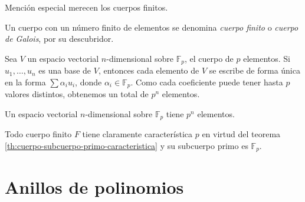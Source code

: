 
Mención especial merecen los cuerpos finitos.

Un cuerpo con un número finito de elementos se denomina \textit{cuerpo finito} o \textit{cuerpo de Galois}, por su descubridor.

Sea \(V\) un espacio vectorial \(n\)-dimensional sobre \(\mathbb F_p\), el cuerpo de \(p\) elementos.
Si \(u_1, \dots, u_n\) es una base de \(V\), entonces cada elemento de \(V\) se escribe de forma única en la forma \(\sum \alpha_iu_i\), donde \(\alpha_i \in \mathbb F_p\).
Como cada coeficiente puede tener hasta \(p\) valores distintos, obtenemos un total de \(p^n\) elementos.

\begin{lemma}
  Un espacio vectorial \(n\)-dimensional sobre \(\mathbb F_p\) tiene \(p^n\) elementos.
\end{lemma}

Todo cuerpo finito \(F\) tiene claramente característica \(p\) en virtud del teorema \ref{th:cuerpo-subcuerpo-primo-caracteristica} y su subcuerpo primo es \(\mathbb F_p\).

\section{Anillos de polinomios}





